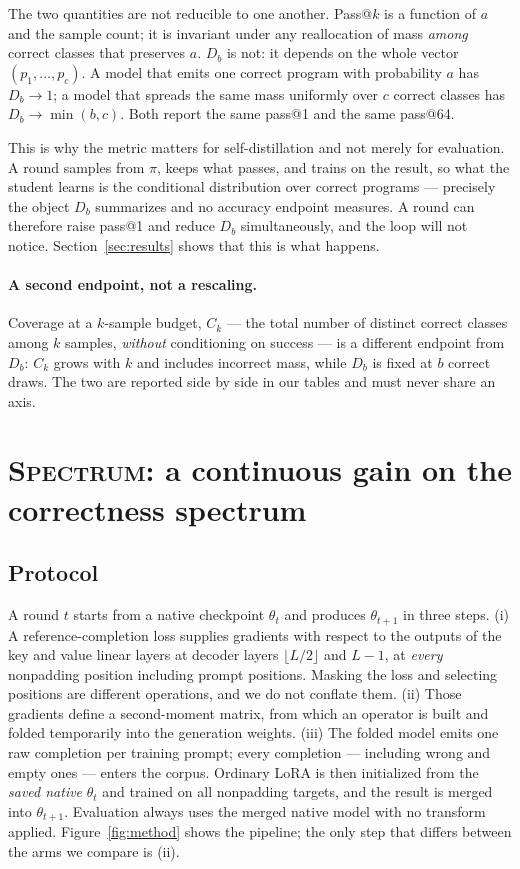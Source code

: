 \documentclass{article}
\newcommand{\method}{\textsc{Spectrum}}
\begin{document}
The two quantities are not reducible to one another. Pass@$k$ is a function of $a$ and the sample count; it is invariant under any reallocation of mass \emph{among} correct classes that preserves $a$. $D_b$ is not: it depends on the whole vector $(p_1,\dots,p_c)$. A model that emits one correct program with probability $a$ has $D_b\to 1$; a model that spreads the same mass uniformly over $c$ correct classes has $D_b \to \min(b,c)$. Both report the same pass@1 and the same pass@64.

This is why the metric matters for self-distillation and not merely for evaluation. A round samples from $\pi$, keeps what passes, and trains on the result, so what the student learns is the conditional distribution over correct programs --- precisely the object $D_b$ summarizes and no accuracy endpoint measures. A round can therefore raise pass@1 and reduce $D_b$ simultaneously, and the loop will not notice. Section~\ref{sec:results} shows that this is what happens.

\paragraph{A second endpoint, not a rescaling.} Coverage at a $k$-sample budget, $C_k$ --- the total number of distinct correct classes among $k$ samples, \emph{without} conditioning on success --- is a different endpoint from $D_b$: $C_k$ grows with $k$ and includes incorrect mass, while $D_b$ is fixed at $b$ correct draws. The two are reported side by side in our tables and must never share an axis.

\section{\method: a continuous gain on the correctness spectrum}
\label{sec:method}

\subsection{Protocol}
\label{sec:protocol}

A round $t$ starts from a native checkpoint $\theta_t$ and produces $\theta_{t+1}$ in three steps. (i) A reference-completion loss supplies gradients with respect to the outputs of the key and value linear layers at decoder layers $\lfloor L/2\rfloor$ and $L-1$, at \emph{every} nonpadding position including prompt positions. Masking the loss and selecting positions are different operations, and we do not conflate them. (ii) Those gradients define a second-moment matrix, from which an operator is built and folded temporarily into the generation weights. (iii) The folded model emits one raw completion per training prompt; every completion --- including wrong and empty ones --- enters the corpus. Ordinary LoRA is then initialized from the \emph{saved native} $\theta_t$ and trained on all nonpadding targets, and the result is merged into $\theta_{t+1}$. Evaluation always uses the merged native model with no transform applied. Figure~\ref{fig:method} shows the pipeline; the only step that differs between the arms we compare is (ii).
\end{document}

